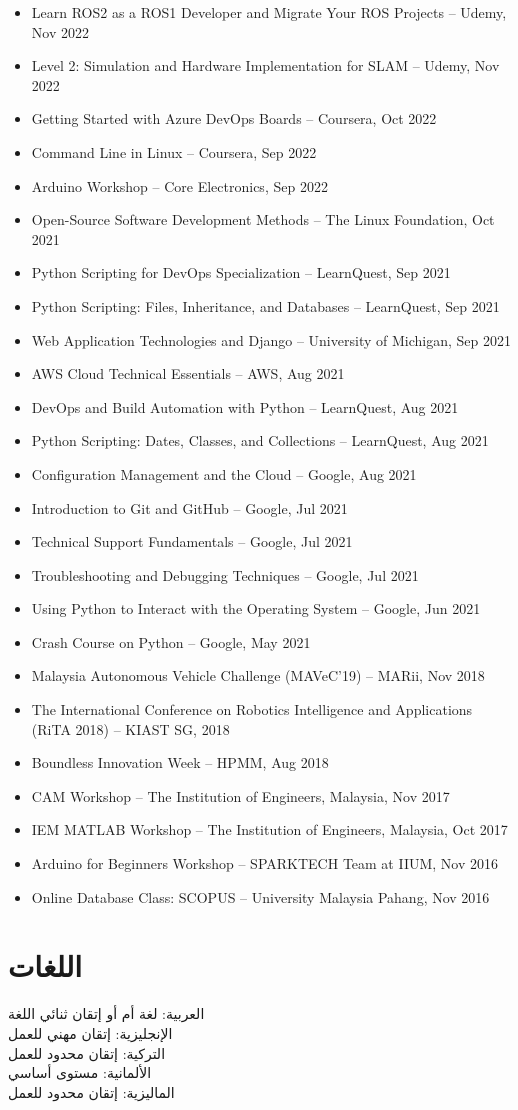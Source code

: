 \documentclass[11pt,a4paper]{article}
\newcommand{\en}[1]{\textenglish{#1}}
\begin{document}
\begin{itemize}
    \item \en{Learn ROS2 as a ROS1 Developer and Migrate Your ROS Projects -- Udemy, Nov 2022}
    \item \en{Level 2: Simulation and Hardware Implementation for SLAM -- Udemy, Nov 2022}
    \item \en{Getting Started with Azure DevOps Boards -- Coursera, Oct 2022}
    \item \en{Command Line in Linux -- Coursera, Sep 2022}
    \item \en{Arduino Workshop -- Core Electronics, Sep 2022}
    \item \en{Open-Source Software Development Methods -- The Linux Foundation, Oct 2021}
    \item \en{Python Scripting for DevOps Specialization -- LearnQuest, Sep 2021}
    \item \en{Python Scripting: Files, Inheritance, and Databases -- LearnQuest, Sep 2021}
    \item \en{Web Application Technologies and Django -- University of Michigan, Sep 2021}
    \item \en{AWS Cloud Technical Essentials -- AWS, Aug 2021}
    \item \en{DevOps and Build Automation with Python -- LearnQuest, Aug 2021}
    \item \en{Python Scripting: Dates, Classes, and Collections -- LearnQuest, Aug 2021}
    \item \en{Configuration Management and the Cloud -- Google, Aug 2021}
    \item \en{Introduction to Git and GitHub -- Google, Jul 2021}
    \item \en{Technical Support Fundamentals -- Google, Jul 2021}
    \item \en{Troubleshooting and Debugging Techniques -- Google, Jul 2021}
    \item \en{Using Python to Interact with the Operating System -- Google, Jun 2021}
    \item \en{Crash Course on Python -- Google, May 2021}
    \item \en{Malaysia Autonomous Vehicle Challenge (MAVeC'19) -- MARii, Nov 2018}
    \item \en{The International Conference on Robotics Intelligence and Applications (RiTA 2018) -- KIAST SG, 2018}
    \item \en{Boundless Innovation Week -- HPMM, Aug 2018}
    \item \en{CAM Workshop -- The Institution of Engineers, Malaysia, Nov 2017}
    \item \en{IEM MATLAB Workshop -- The Institution of Engineers, Malaysia, Oct 2017}
    \item \en{Arduino for Beginners Workshop -- SPARKTECH Team at IIUM, Nov 2016}
    \item \en{Online Database Class: SCOPUS -- University Malaysia Pahang, Nov 2016}
\end{itemize}

\section*{اللغات}

العربية: لغة أم أو إتقان ثنائي اللغة\\
الإنجليزية: إتقان مهني للعمل\\
التركية: إتقان محدود للعمل\\
الألمانية: مستوى أساسي\\
الماليزية: إتقان محدود للعمل
\end{document}
